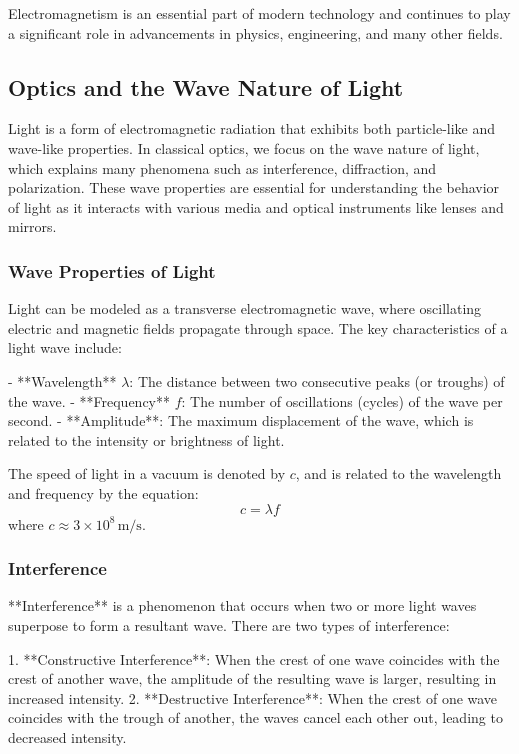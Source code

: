 \documentclass{article}
\begin{document}
Electromagnetism is an essential part of modern technology and continues to play a significant role in advancements in physics, engineering, and many other fields.

\subsection{Optics and the Wave Nature of Light}

Light is a form of electromagnetic radiation that exhibits both particle-like and wave-like properties. In classical optics, we focus on the wave nature of light, which explains many phenomena such as interference, diffraction, and polarization. These wave properties are essential for understanding the behavior of light as it interacts with various media and optical instruments like lenses and mirrors.

\subsubsection*{Wave Properties of Light}

Light can be modeled as a transverse electromagnetic wave, where oscillating electric and magnetic fields propagate through space. The key characteristics of a light wave include:

- **Wavelength** \( \lambda \): The distance between two consecutive peaks (or troughs) of the wave.
- **Frequency** \( f \): The number of oscillations (cycles) of the wave per second.
- **Amplitude**: The maximum displacement of the wave, which is related to the intensity or brightness of light.

The speed of light in a vacuum is denoted by \( c \), and is related to the wavelength and frequency by the equation:
\[
c = \lambda f
\]
where \( c \approx 3 \times 10^8 \, \text{m/s} \).

\subsubsection*{Interference}

**Interference** is a phenomenon that occurs when two or more light waves superpose to form a resultant wave. There are two types of interference:

1. **Constructive Interference**: When the crest of one wave coincides with the crest of another wave, the amplitude of the resulting wave is larger, resulting in increased intensity.
2. **Destructive Interference**: When the crest of one wave coincides with the trough of another, the waves cancel each other out, leading to decreased intensity.
\end{document}
